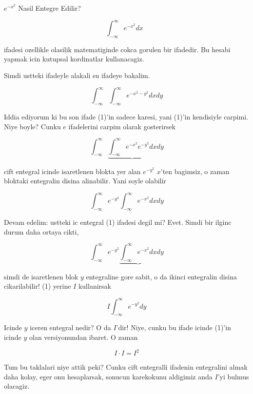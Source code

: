\documentclass[12pt,fleqn]{article}
\begin{document}
$e^{-x^2}$ Nasil Entegre Edilir? 

\[ \int_{-\infty}^{\infty} e^{-x^2} dx \ \ \ \label{1} \]

ifadesi ozellikle olasilik matematiginde cokca gorulen bir ifadedir. Bu
hesabi yapmak icin kutupsal kordinatlar kullanacagiz. 

Simdi ustteki ifadeyle alakali su ifadeye bakalim. 

\[ \int_{-\infty}^{\infty} \int_{-\infty}^{\infty} e^{-x^2-y^2} dx dy \]

Iddia ediyorum ki bu son ifade (1)'in sadece karesi, yani (1)'in kendisiyle
carpimi. Niye boyle? Cunku $e$ ifadelerini carpim olarak gosterirsek

\[ \int_{-\infty}^{\infty} 
\underbrace{\int_{-\infty}^{\infty} e^{-x^2} e^{-y^2} dx}
dy \]

cift entegral icinde isaretlenen blokta yer alan $e^{-y^2}$ $x$'ten
bagimsiz, o zaman bloktaki entegralin disina alinabilir. Yani soyle olabilir

\[ \int_{-\infty}^{\infty} 
e^{-y^2} \int_{-\infty}^{\infty} e^{-x^2}  dx
dy \]

Devam edelim: ustteki ic entegral (1) ifadesi degil mi? Evet. Simdi bir
ilginc durum daha ortaya cikti, 

\[ \int_{-\infty}^{\infty}  e^{-y^2} 
\underbrace{\int_{-\infty}^{\infty} e^{-x^2}  dx}
dy \]

simdi de isaretlenen blok $y$ entegraline gore sabit, o da ikinci
entegralin disina cikarilabilir! (1) yerine $I$ kullanirsak 

\[ I \int_{-\infty}^{\infty}  e^{-y^2} dy \]

Icinde $y$ iceren entegral nedir? O da $I$'dir! Niye, cunku bu ifade icinde
(1)'in icinde $y$ olan versiyonundan ibaret. O zaman 

\[ I \cdot I = I^2 \]

Tum bu taklalari niye attik peki? Cunku cift entegralli ifadenin
entegralini almak daha kolay, eger onu hesaplarsak, sonucun karekokunu
aldigimiz anda $I$'yi bulmus olacagiz. 
\end{document}
